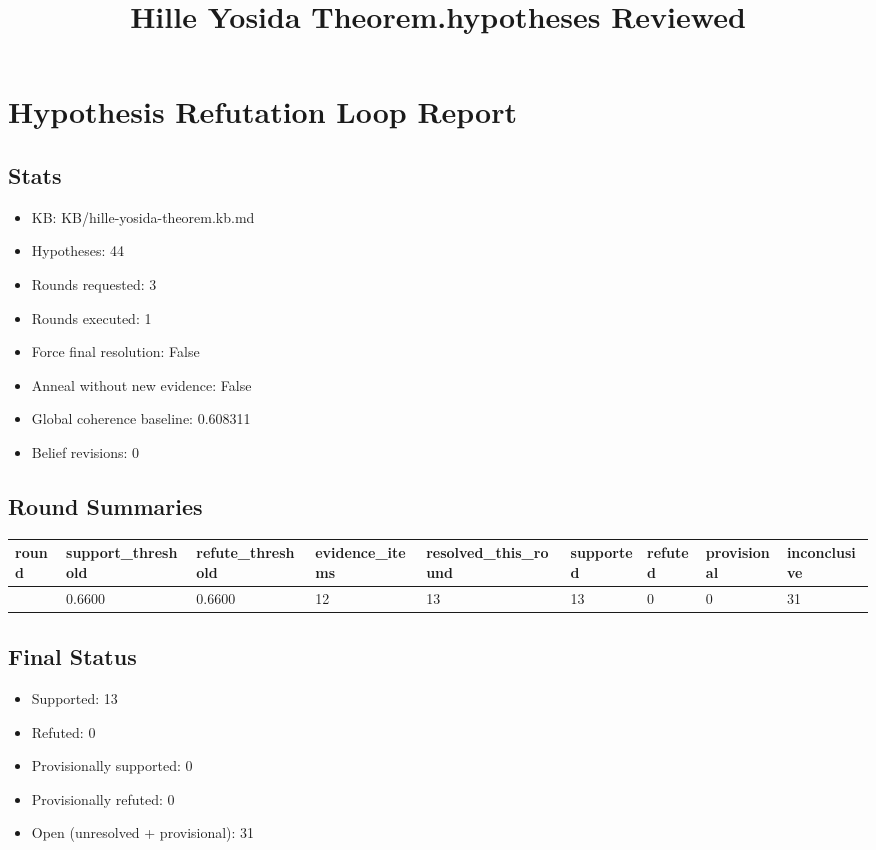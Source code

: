 \documentclass[
]{article}
\title{Hille Yosida Theorem.hypotheses Reviewed}
\author{}
\date{}
\newcounter{none} %
\providecommand{\tightlist}{%
  \setlength{\itemsep}{0pt}\setlength{\parskip}{0pt}}
\begin{document}
\maketitle

\section{Hypothesis Refutation Loop
Report}\label{hypothesis-refutation-loop-report}

\subsection{Stats}\label{stats}

\begin{itemize}
\tightlist
\item
  KB: KB/hille-yosida-theorem.kb.md
\item
  Hypotheses: 44
\item
  Rounds requested: 3
\item
  Rounds executed: 1
\item
  Force final resolution: False
\item
  Anneal without new evidence: False
\item
  Global coherence baseline: 0.608311
\item
  Belief revisions: 0
\end{itemize}

\subsection{Round Summaries}\label{round-summaries}

{\def\LTcaptype{none} %
\begin{longtable}[]{@{}lllllllll@{}}
\toprule\noalign{}
round & support\_threshold & refute\_threshold & evidence\_items &
resolved\_this\_round & supported & refuted & provisional &
inconclusive \\
\midrule\noalign{}
\endhead
\bottomrule\noalign{}
\endlastfoot
1 & 0.6600 & 0.6600 & 12 & 13 & 13 & 0 & 0 & 31 \\
\end{longtable}
}

\subsection{Final Status}\label{final-status}

\begin{itemize}
\tightlist
\item
  Supported: 13
\item
  Refuted: 0
\item
  Provisionally supported: 0
\item
  Provisionally refuted: 0
\item
  Open (unresolved + provisional): 31
\end{itemize}
\end{document}
